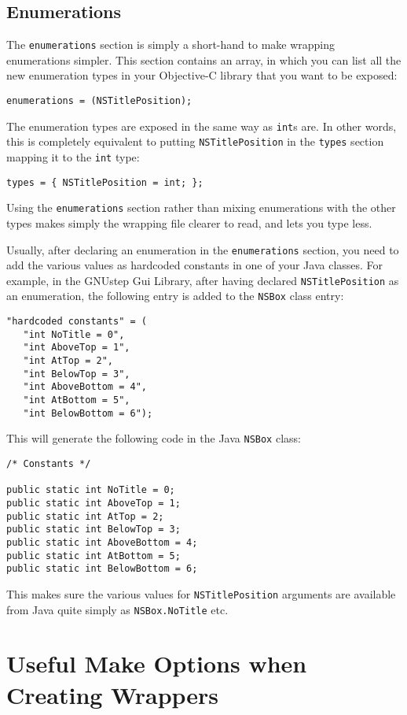 \subsection{Enumerations}
The \texttt{enumerations} section is simply a short-hand to make
wrapping enumerations simpler.  This section contains an array, in
which you can list all the new enumeration types in your Objective-C
library that you want to be exposed:
\begin{verbatim}
enumerations = (NSTitlePosition);
\end{verbatim}
The enumeration types are exposed in the same way as \texttt{int}s
are.  In other words, this is completely equivalent to putting
\texttt{NSTitlePosition} in the \texttt{types} section mapping it to
the \texttt{int} type:
\begin{verbatim}
types = { NSTitlePosition = int; };
\end{verbatim}
Using the \texttt{enumerations} section rather than mixing
enumerations with the other types makes simply the wrapping file
clearer to read, and lets you type less.

Usually, after declaring an enumeration in the \texttt{enumerations} 
section, you need to add the various values as hardcoded constants 
in one of your Java classes.  For example, in the GNUstep Gui 
Library, after having declared \texttt{NSTitlePosition} as an 
enumeration, the following entry is added to the \texttt{NSBox} 
class entry:
\begin{verbatim}
"hardcoded constants" = (
   "int NoTitle = 0",
   "int AboveTop = 1",
   "int AtTop = 2",
   "int BelowTop = 3",
   "int AboveBottom = 4",
   "int AtBottom = 5",
   "int BelowBottom = 6");
\end{verbatim}
This will generate the following code in the Java \texttt{NSBox} class:
\begin{verbatim}
/* Constants */

public static int NoTitle = 0;
public static int AboveTop = 1;
public static int AtTop = 2;
public static int BelowTop = 3;
public static int AboveBottom = 4;
public static int AtBottom = 5;
public static int BelowBottom = 6;
\end{verbatim}
This makes sure the various values for \texttt{NSTitlePosition}
arguments are available from Java quite simply as \texttt{NSBox.NoTitle} 
etc.

\section{Useful Make Options when Creating Wrappers}

